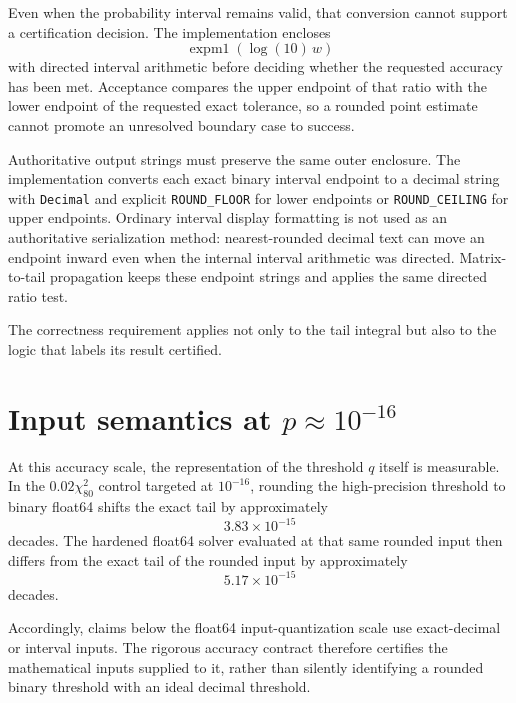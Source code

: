 Even when the probability interval remains valid, that conversion cannot
support a certification decision. The implementation encloses
\[
\boxed{
\operatorname{expm1}(\log(10)\,w)
}
\]
with directed interval arithmetic before deciding whether the requested
accuracy has been met.  Acceptance compares the upper endpoint of that ratio
with the lower endpoint of the requested exact tolerance, so a rounded point
estimate cannot promote an unresolved boundary case to success.

Authoritative output strings must preserve the same outer enclosure.  The
implementation converts each exact binary interval endpoint to a decimal
string with \texttt{Decimal} and explicit \texttt{ROUND\_FLOOR} for lower
endpoints or \texttt{ROUND\_CEILING} for upper endpoints.  Ordinary interval
display formatting is not used as an authoritative serialization method:
nearest-rounded decimal text can move an endpoint inward even when the
internal interval arithmetic was directed.  Matrix-to-tail propagation keeps
these endpoint strings and applies the same directed ratio test.

The correctness requirement applies not only to the tail integral but also
to the logic that labels its result certified.

\section{Input semantics at \texorpdfstring{\(p\approx10^{-16}\)}{p about 1e-16}}

At this accuracy scale, the representation of the threshold \(q\) itself is
measurable.  In the \(0.02\chi^2_{80}\) control targeted at \(10^{-16}\),
rounding the high-precision threshold to binary float64 shifts the exact tail
by approximately
\[
3.83\times10^{-15}
\]
decades.  The hardened float64 solver evaluated at that same rounded input
then differs from the exact tail of the rounded input by approximately
\[
5.17\times10^{-15}
\]
decades.

Accordingly, claims below the float64 input-quantization scale use exact-decimal
or interval inputs.  The rigorous accuracy contract therefore certifies the
mathematical inputs supplied to it, rather than silently identifying a rounded
binary threshold with an ideal decimal threshold.




